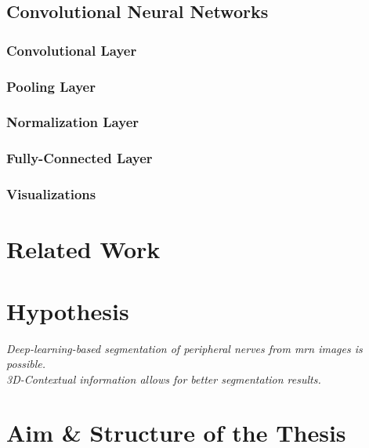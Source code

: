 \subsection{Convolutional Neural Networks}
\cite{KarpathyStanfordRecognition}

\subsubsection{Convolutional Layer}
\subsubsection{Pooling Layer}
\subsubsection{Normalization Layer}
\subsubsection{Fully-Connected Layer}

\subsubsection{Visualizations}



\section{Related Work}
\section{Hypothesis}

\textit{Deep-learning-based segmentation of peripheral nerves from \gls{mrn} images is possible.} \\
\textit{3D-Contextual information allows for better segmentation results.}

\section{Aim \& Structure of the Thesis}

\endinput